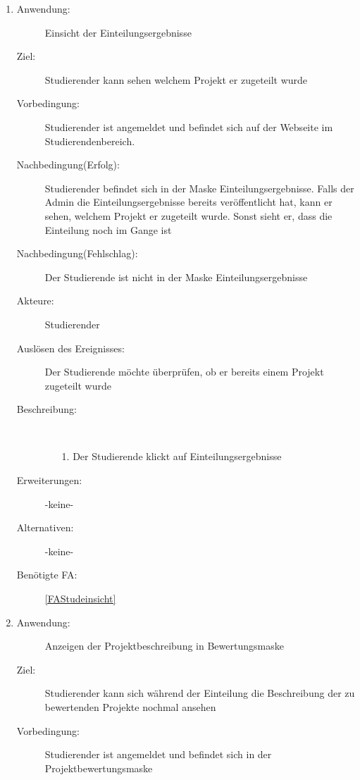 \documentclass[parskip=full]{scrartcl}
\newcommand{\swtLabel}[1]{\textbf{/#1\arabic*0/}}
\begin{document}
\begin{enumerate}[label=\swtLabel{S}]
     \item \label{UCstudEinsichtEinteilung}
  \begin{description}
  \item[Anwendung:] Einsicht der Einteilungsergebnisse
  \item[Ziel:] \gls{Studierender} kann sehen welchem \gls{Projekt} er
  zugeteilt wurde
  	\item[Vorbedingung:] \gls{Studierender} ist angemeldet und befindet sich auf der
  	Webseite im Studierendenbereich. 
  	\item[Nachbedingung(Erfolg):] \gls{Studierender} befindet sich in der Maske
  	Einteilungsergebnisse. %
  	Falls der \gls{Admin} die Einteilungsergebnisse bereits veröffentlicht hat,
  	kann er sehen, welchem \gls{Projekt} er zugeteilt wurde. Sonst sieht er, dass
  	die Einteilung noch im Gange ist %
  	\item[Nachbedingung(Fehlschlag):] Der Studierende ist nicht in der
  	Maske Einteilungsergebnisse
  	\item[Akteure:] \gls{Studierender}
  	\item[Auslösen des Ereignisses:] Der Studierende möchte überprüfen, ob er
  	bereits einem Projekt zugeteilt wurde
  	\item[Beschreibung:]~
  	\begin{enumerate}
  	  \item[1.] Der Studierende klickt auf Einteilungsergebnisse
 
  	\end{enumerate}
  	\item[Erweiterungen:] -keine-

  	\item[Alternativen:] -keine-
  	
  	 \item[Benötigte FA:] \ref{FAStudeinsicht}
  \end{description}
  
    \item \label{UCstudProjektbeschreibung}
  \begin{description}
  \item[Anwendung:] Anzeigen der Projektbeschreibung in Bewertungsmaske
  \item[Ziel:] Studierender kann sich während der Einteilung die Beschreibung
  der zu bewertenden Projekte nochmal ansehen
  	\item[Vorbedingung:] Studierender ist angemeldet und befindet sich in der
  	Projektbewertungsmaske %
  	

\end{description}
\end{enumerate}
\end{document}
